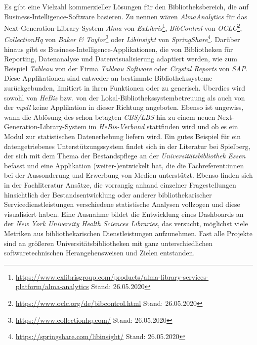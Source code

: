 Es gibt eine Vielzahl kommerzieller Lösungen für den Bibliotheksbereich, die auf Business-Intelligence-Software basieren.
Zu nennen wären \textit{AlmaAnalytics} für das
Next-Generation-Library-System \textit{Alma} von \textit{ExLibris}\footnote{\url{https://www.exlibrisgroup.com/products/alma-library-services-platform/alma-analytics}
Stand: 26.05.2020}, \textit{BibControl} von \textit{OCLC}\footnote{\url{https://www.oclc.org/de/bibcontrol.html} Stand: 26.05.2020},
\textit{CollectionHq} von \textit{Baker \& Taylor}\footnote{\url{https://www.collectionhq.com/} Stand: 26.05.2020} oder \textit{Libinsight} von \textit{SpringShare}\footnote{\url{https://springshare.com/libinsight/} Stand: 26.05.2020}.
Darüber hinaus gibt es Business-Intelligence-Applikationen, die von
Bibliotheken für Reporting, Datenanalyse und Datenvisualisierung adaptiert werden,
wie zum Beispiel \textit{Tableau} von der Firma \textit{Tableau Software} oder
\textit{Crystal Reports} von \textit{SAP}.
Diese Applikationen sind entweder
an bestimmte Bibliothekssysteme zurückgebunden, limitiert in ihren
Funktionen\cite{golas_statistische_2018} oder zu generisch.
Überdies wird sowohl von \textit{HeBis} bzw. von der
Lokal-Bibliothekssystembetreuung als auch von der \textit{mpdl} keine Applikation
in dieser Richtung angeboten.
Ebenso ist ungewiss, wann die Ablösung des schon betagten \textit{CBS/LBS} hin zu
einem neuen Next-Generation-Library-System im \textit{HeBis-Verbund} stattfinden wird und ob
es ein Modul zur statistischen Datenerhebung liefern wird.
Ein gutes Beispiel für ein datengetriebenes Unterstützungssystem findet sich in
der Literatur bei Spielberg, der sich mit dem Thema der Bestandspflege an der
\textit{Universitätsbibliothek Essen} befasst und eine Applikation (weiter-)entwickelt hat, die
die Fachreferent:innen bei der Aussonderung und Erwerbung von Medien
unterstützt.\cite{spielberg_eike_t_fachref-assistent_nodate}
Ebenso finden sich in der Fachliteratur Ansätze, die vorrangig anhand einzelner
Fragestellungen hinsichtlich der Bestandsentwicklung\cite{hughes_long-term_2016} oder anderer
bibliothekarischer Servicedienstleistungen\cite{kutlay_shiny_2020, knievel_use_2006,meyer_using_2018} verschiedene statistische Analysen
vollzogen und diese visualisiert haben.
Eine Ausnahme bildet die Entwicklung eines Dashboards an der \textit{New York
University Health Sciences Libraries}, das versucht, möglichst viele Metriken
aus bibliothekarischen Dienstleistungen aufzunehmen.\cite{morton-owens_trends_2012}
Fast alle Projekte sind an größeren
Universitätsbibliotheken mit ganz unterschiedlichen softwaretechnischen
Herangehensweisen\cite{finch_using_2016, wiegand_visualizing_2013} und Zielen\cite{phetteplace_effectively_2012} entstanden.

